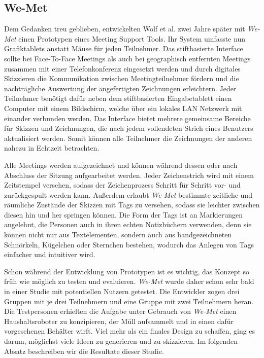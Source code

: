 \subsection{We-Met}
Dem Gedanken treu geblieben, entwickelten Wolf et al. zwei Jahre später mit \emph{We-Met} \citep{Wolf:1997p75} einen Prototypen eines Meeting Support Tools. Ihr System umfasste nun Grafiktablets anstatt Mäuse für jeden Teilnehmer. Das stiftbasierte Interface sollte bei Face-To-Face Meetings als auch bei geographisch entfernten Meetings zusammen mit einer Telefonkonferenz eingesetzt werden und durch digitales Skizzieren die Kommunikation zwischen Meetingteilnehmer fördern und die nachträgliche Auswertung der angefertigten Zeichnungen erleichtern. Jeder Teilnehmer benötigt dafür neben dem stiftbasierten Eingabetablett einen Computer mit einem Bildschirm, welche über ein lokales LAN Netzwerk mit einander verbunden werden. Das Interface bietet mehrere gemeinsame Bereiche für Skizzen und Zeichnungen, die nach jedem vollendeten Strich eines Benutzers aktualisiert werden. Somit können alle Teilnehmer die Zeichnungen der anderen nahezu in Echtzeit betrachten.

Alle Meetings werden aufgezeichnet und können während dessen oder nach Abschluss der Sitzung aufgearbeitet werden. Jeder Zeichenstrich wird mit einem Zeitstempel versehen, sodass der Zeichenprozess Schritt für Schritt vor- und zurückgespult werden kann. Außerdem erlaubt \emph{We-Met} bestimmte zeitliche und räumliche Zustände der Skizzen mit Tags zu versehen, sodass sie leichter zwischen diesen hin und her springen können. Die Form der Tags ist an Markierungen angelehnt, die Personen auch in ihren echten Notizbüchern verwenden, denn sie können nicht nur aus Textelementen, sondern auch aus handgezeichneten Schnörkeln, Kügelchen oder Sternchen bestehen, wodurch das Anlegen von Tags einfacher und intuitiver wird.

\medskip Schon während der Entwicklung von Prototypen ist es wichtig, das Konzept so früh wie möglich zu testen und evaluieren. \emph{We-Met} wurde daher schon sehr bald in einer Studie mit potentiellen Nutzern getestet. Die Entwickler zogen drei Gruppen mit je drei Teilnehmern und eine Gruppe mit zwei Teilnehmern heran. Die Testpersonen erhielten die Aufgabe unter Gebrauch von \emph{We-Met} einen Haushaltsroboter zu konzipieren, der Müll aufsammelt und in einen dafür vorgesehenen Behälter wirft. Viel mehr als ein finales Design zu schaffen, ging es darum, möglichst viele Ideen zu generieren und zu skizzieren. Im folgenden Absatz beschreiben wir die Resultate dieser Studie.


